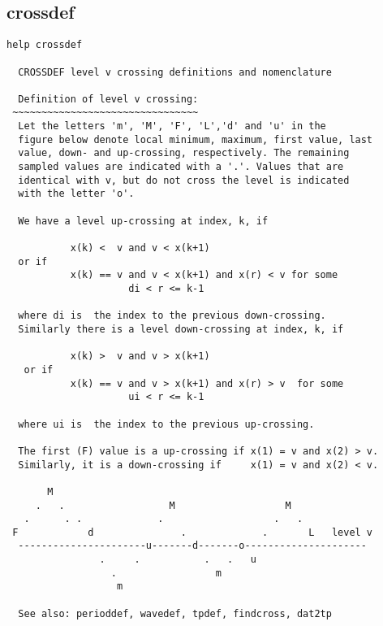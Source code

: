   \subsection{crossdef}
  {\small\begin{verbatim}
help crossdef

  CROSSDEF level v crossing definitions and nomenclature

  Definition of level v crossing:
 ~~~~~~~~~~~~~~~~~~~~~~~~~~~~~~~~
  Let the letters 'm', 'M', 'F', 'L','d' and 'u' in the
  figure below denote local minimum, maximum, first value, last
  value, down- and up-crossing, respectively. The remaining
  sampled values are indicated with a '.'. Values that are
  identical with v, but do not cross the level is indicated
  with the letter 'o'.

  We have a level up-crossing at index, k, if

           x(k) <  v and v < x(k+1)
  or if
           x(k) == v and v < x(k+1) and x(r) < v for some
                     di < r <= k-1

  where di is  the index to the previous down-crossing.
  Similarly there is a level down-crossing at index, k, if

           x(k) >  v and v > x(k+1)
   or if
           x(k) == v and v > x(k+1) and x(r) > v  for some
                     ui < r <= k-1

  where ui is  the index to the previous up-crossing.

  The first (F) value is a up-crossing if x(1) = v and x(2) > v.
  Similarly, it is a down-crossing if     x(1) = v and x(2) < v.

       M
     .   .                  M                   M
   .      . .             .                   .   .
 F            d               .             .       L   level v
  ----------------------u-------d-------o---------------------
                .     .           .   .   u
                  .                 m
                   m

  See also: perioddef, wavedef, tpdef, findcross, dat2tp
\end{verbatim}
      }


